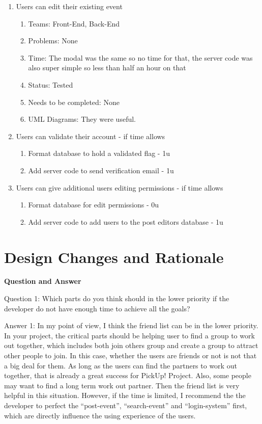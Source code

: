 \documentclass[a4paper]{article}
\begin{document}
\begin{enumerate}
\item Users can edit their existing event
\begin{enumerate}
\item Teams: Front-End, Back-End
\item Problems: None
\item Time: The modal was the same so no time for that, the server code was also super simple so less than half an hour on that
\item Status: Tested
\item Needs to be completed: None 
\item UML Diagrams: They were useful.
\end{enumerate}


\item Users can validate their account - if time allows
\begin{enumerate}
\item Format database to hold a validated flag - 1u
\item Add server code to send verification email - 1u
\end{enumerate}


\item Users can give additional users editing permissions - if time allows
\begin{enumerate}
\item Format database for edit permissions - 0u
\item Add server code to add users to the post editors database - 1u
\end{enumerate}

\end{enumerate}
\newpage

\section{Design Changes and Rationale}
\textbf{Question and Answer}

Question 1: Which parts do you think should in the lower priority if the developer do not have enough time to achieve all the goals?

Answer 1: In my point of view, I think the friend list can be in the lower priority. In your project, the critical parts should be helping user to find a group to work out together, which includes both join others group and create a group to attract other people to join. In this case, whether the users are friends or not is not that a big deal for them. As long as the users can find the partners to work out together, that is already a great success for PickUp! Project. Also, some people may want to find a long term work out partner. Then the friend list is very helpful in this situation. However, if the time is limited, I recommend the the developer to perfect the “post-event”, “search-event” and “login-system” first, which are directly influence the using experience of the users. 
\end{document}
